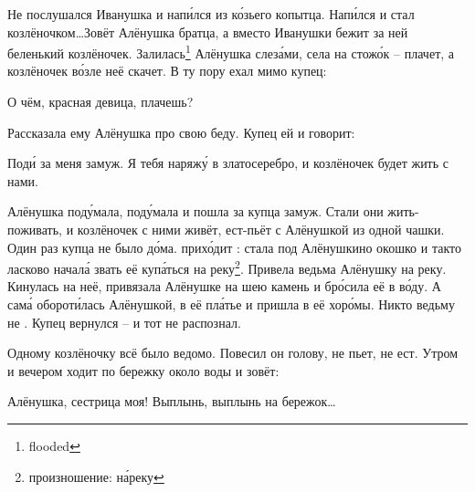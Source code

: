 %
Не послушался Иванушка и нап\'{и}лся из к\'{о}зьего копытца. Нап\'{и}лся и стал козлёночком\dots Зовёт Алёнушка братца, а вместо Иванушки бежит за ней беленький козлёночек. Залилась\footnote{flooded} Алёнушка слез\'{а}ми, села на стож\'{о}к -- плачет, а козлёночек в\'{о}зле неё скачет. В ту пору ехал мимо купец:
%
\begin{dialogue}
    \item О чём, красная девица, плачешь?
\end{dialogue}
Рассказала ему Алёнушка про свою беду. Купец ей и говорит:
\begin{dialogue}
    \item Под\'{и} за меня замуж. Я тебя наряж\'{у} в златосеребро, и козлёночек будет жить с нами.
\end{dialogue}
Алёнушка под\'{у}мала, под\'{у}мала и пошла за купца замуж. Стали они жить-поживать, и козлёночек с ними живёт, ест-пьёт с Алёнушкой из одной чашки. Один раз купца не было д\'{о}ма.  прих\'{о}дит : стала под Алёнушкино окошко и такто ласково начал\'{а} звать её куп\'{а}ться на реку\footnote{произношение: н\'{а}реку}. Привела ведьма Алёнушку на реку. Кинулась на неё, привязала Алёнушке на шею камень и бр\'{о}сила её в в\'{о}ду. А сам\'{а} оборот\'{и}лась Алёнушкой,  в её пл\'{а}тье и пришла в её хор\'{о}мы. Никто ведьму не . Купец вернулся -- и тот не распознал.

Одному козлёночку всё было ведомо. Повесил он голову, не пьет, не ест. Утром и вечером ходит по бережку около воды и зовёт:
\begin{dialogue}
    \item Алёнушка, сестрица моя! Выплынь, выплынь на бережок\dots
\end{dialogue}

